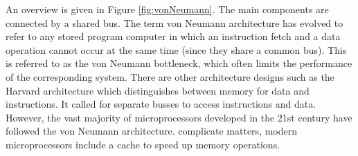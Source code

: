 \documentclass[letterpaper, 12pt]{book}
\newcommand*{\myaside}[2]{\noindent
    \colorbox{red!10}{\noindent
        \begin{minipage}{\textwidth}
            \textbf{Aside: #1} 
            #2
        \end{minipage}
    }
}
\begin{document}
An overview is given in Figure \ref{fig:vonNeumann}. The main components are connected by a shared bus. %
%
The term \gls{von Neumann architecture} has evolved to refer to any \gls{stored program computer} in which an 
instruction fetch and a data operation cannot occur at the same time (since they share a common bus). 
This is referred to as the von Neumann bottleneck, which often limits the performance of the corresponding 
system. %
There are other architecture designs such as the \gls{Harvard architecture} which distinguishes between 
memory for data and instructions. It called for separate busses to access instructions and data. However, 
the vast majority of microprocessors developed in the 21st century have followed the \gls{von Neumann architecture}. %
%
 complicate matters, modern microprocessors include a \gls{cache} to speed up memory operations.

\end{document}
